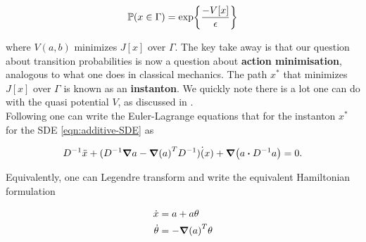 \begin{align}
    \mathbb{P} (x \in \Gamma) = \exp{\frac{-V[x]}{\epsilon} }
\end{align}

where $V(a, b)$ minimizes $J[x]$ over $\Gamma$. The key take away is that our question about transition probabilities is now a question about \textbf{action minimisation}, analogous to what one does in classical mechanics. The path $x^*$ that minimizes $J[x]$ over $\Gamma$ is known as an \textbf{instanton}. We quickly note there is a lot one can do with the quasi potential $V$, as discussed in \cite{Grafke2019}.\\

Following \cite{Grafke2019} one can write the Euler-Lagrange equations that for the instanton $x^*$ for the SDE \ref{eqn:additive-SDE} as

\begin{align}
    D^{-1}\ddot{x} + (D^{-1}\grad a - \grad(a)^T D^{-1})\dot(x) + \grad (a \vdot D^{-1}a) = 0.
\end{align}

Equivalently, one can Legendre transform and write the equivalent Hamiltonian formulation

\begin{align}
    \dot{x} &= a + a \theta\\
    \dot{\theta} &= - \grad(a)^T\theta
\end{align}
